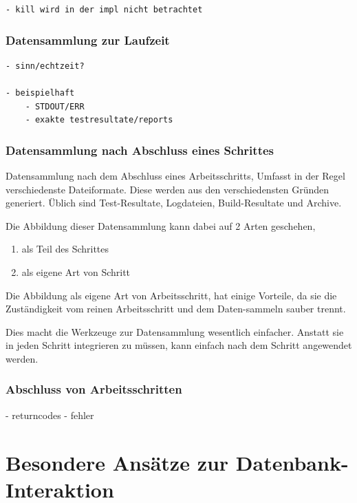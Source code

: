 \begin{verbatim}
- kill wird in der impl nicht betrachtet

\end{verbatim}


\subsubsection{Datensammlung zur Laufzeit}

\begin{verbatim}
- sinn/echtzeit?

- beispielhaft
    - STDOUT/ERR
    - exakte testresultate/reports
\end{verbatim}



\subsubsection{Datensammlung nach Abschluss eines Schrittes}

Datensammlung nach dem Abschluss eines Arbeitsschritts,
Umfasst in der Regel verschiedenste Dateiformate.
Diese werden aus den verschiedensten Gründen generiert.
Üblich sind Test-Resultate, Logdateien, Build-Resultate und Archive.

Die Abbildung dieser Datensammlung kann dabei auf 2 Arten geschehen,

\begin{enumerate}
    \item als Teil des Schrittes
    \item als eigene Art von Schritt
\end{enumerate}

Die Abbildung als eigene Art von Arbeitsschritt,
hat einige Vorteile, da sie die Zuständigkeit vom reinen Arbeitsschritt
und dem Daten-sammeln sauber trennt.

Dies macht die Werkzeuge zur Datensammlung wesentlich einfacher.
Anstatt sie in jeden Schritt integrieren zu müssen,
kann einfach nach dem Schritt angewendet werden.


\subsubsection{Abschluss von Arbeitsschritten}



- returncodes
- fehler

\section{Besondere Ansätze zur Datenbank-Interaktion}

